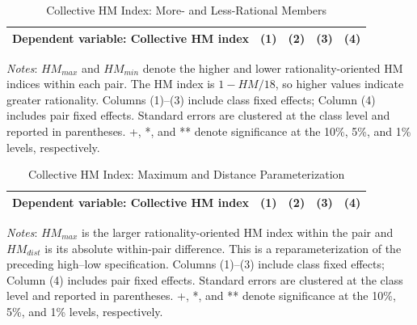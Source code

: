 \documentclass[11 pt]{article}
\begin{document}
\begin{table}[H]
\centering
\caption{Collective HM Index: More- and Less-Rational Members}
\label{tab:collective_hm_highlow}
\begin{tabular}{lcccc}
\toprule
Dependent variable: Collective HM index & (1) & (2) & (3) & (4) \\
\midrule

\end{tabular}
\begin{minipage}{\textwidth}
{\footnotesize \emph{Notes}: $HM_{max}$ and $HM_{min}$ denote the higher and lower rationality-oriented HM indices within each pair. The HM index is $1-HM/18$, so higher values indicate greater rationality. Columns (1)--(3) include class fixed effects; Column (4) includes pair fixed effects. Standard errors are clustered at the class level and reported in parentheses. +, *, and ** denote significance at the 10\%, 5\%, and 1\% levels, respectively.}
\end{minipage}
\end{table}

\begin{table}[H]
\centering
\caption{Collective HM Index: Maximum and Distance Parameterization}
\label{tab:collective_hm_maxdist}
\begin{tabular}{lcccc}
\toprule
Dependent variable: Collective HM index & (1) & (2) & (3) & (4) \\
\midrule

\end{tabular}
\begin{minipage}{\textwidth}
{\footnotesize \emph{Notes}: $HM_{max}$ is the larger rationality-oriented HM index within the pair and $HM_{dist}$ is its absolute within-pair difference. This is a reparameterization of the preceding high--low specification. Columns (1)--(3) include class fixed effects; Column (4) includes pair fixed effects. Standard errors are clustered at the class level and reported in parentheses. +, *, and ** denote significance at the 10\%, 5\%, and 1\% levels, respectively.}
\end{minipage}
\end{table}
\end{document}
